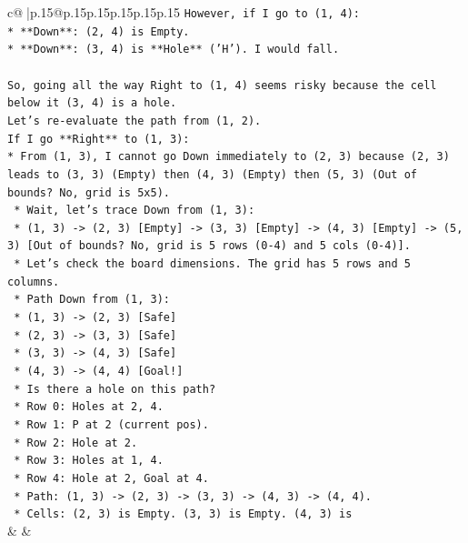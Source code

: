 \documentclass{article}
\begin{document}
{\begin{supertabular}{c@{$\;$}|p{.15\linewidth}@{}p{.15\linewidth}p{.15\linewidth}p{.15\linewidth}p{.15\linewidth}p{.15\linewidth}}
{{{\texttt{However, if I go to (1, 4):} \\
\texttt{*   **Down**: (2, 4) is Empty.} \\
\texttt{*   **Down**: (3, 4) is **Hole** ('H'). I would fall.} \\
\\ 
\texttt{So, going all the way Right to (1, 4) seems risky because the cell below it (3, 4) is a hole.} \\
\texttt{Let's re{-}evaluate the path from (1, 2).} \\
\texttt{If I go **Right** to (1, 3):} \\
\texttt{*   From (1, 3), I cannot go Down immediately to (2, 3) because (2, 3) leads to (3, 3) (Empty) then (4, 3) (Empty) then (5, 3) (Out of bounds? No, grid is 5x5).} \\
\texttt{    *   Wait, let's trace Down from (1, 3):} \\
\texttt{    *   (1, 3) {-}> (2, 3) {[}Empty{]} {-}> (3, 3) {[}Empty{]} {-}> (4, 3) {[}Empty{]} {-}> (5, 3) {[}Out of bounds? No, grid is 5 rows (0{-}4) and 5 cols (0{-}4){]}.} \\
\texttt{    *   Let's check the board dimensions. The grid has 5 rows and 5 columns.} \\
\texttt{    *   Path Down from (1, 3):} \\
\texttt{        *   (1, 3) {-}> (2, 3) {[}Safe{]}} \\
\texttt{        *   (2, 3) {-}> (3, 3) {[}Safe{]}} \\
\texttt{        *   (3, 3) {-}> (4, 3) {[}Safe{]}} \\
\texttt{        *   (4, 3) {-}> (4, 4) {[}Goal!{]}} \\
\texttt{    *   Is there a hole on this path?} \\
\texttt{        *   Row 0: Holes at 2, 4.} \\
\texttt{        *   Row 1: P at 2 (current pos).} \\
\texttt{        *   Row 2: Hole at 2.} \\
\texttt{        *   Row 3: Holes at 1, 4.} \\
\texttt{        *   Row 4: Hole at 2, Goal at 4.} \\
\texttt{    *   Path: (1, 3) {-}> (2, 3) {-}> (3, 3) {-}> (4, 3) {-}> (4, 4).} \\
\texttt{    *   Cells: (2, 3) is Empty. (3, 3) is Empty. (4, 3) is} \\
            }
        }
    }
    & & \\ \\


\end{supertabular}}
\end{document}
